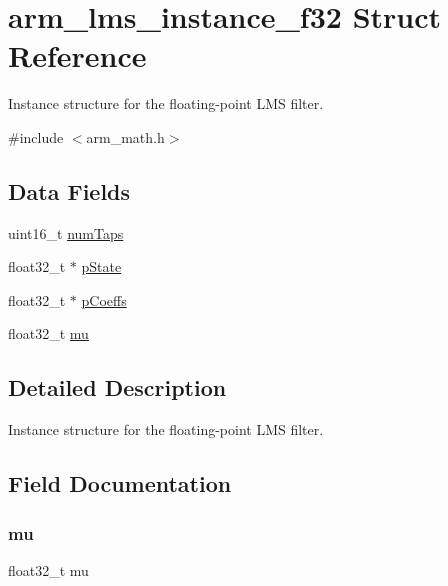 \hypertarget{structarm__lms__instance__f32}{}\section{arm\+\_\+lms\+\_\+instance\+\_\+f32 Struct Reference}
\label{structarm__lms__instance__f32}


Instance structure for the floating-\/point L\+MS filter.  




{\ttfamily \#include $<$arm\+\_\+math.\+h$>$}

\subsection*{Data Fields}
\begin{DoxyCompactItemize}
\item 
uint16\+\_\+t \mbox{\hyperlink{structarm__lms__instance__f32_a751941891e47f522a7f5375fe8990aac}{num\+Taps}}
\item 
float32\+\_\+t $\ast$ \mbox{\hyperlink{structarm__lms__instance__f32_a335c87e6fdc4b96601d95a5de8b9c463}{p\+State}}
\item 
float32\+\_\+t $\ast$ \mbox{\hyperlink{structarm__lms__instance__f32_aacbb8dd8eeba4b21fc2bb40076405ee3}{p\+Coeffs}}
\item 
float32\+\_\+t \mbox{\hyperlink{structarm__lms__instance__f32_a11402afa7c9b9dac4cb953fa386e74d2}{mu}}
\end{DoxyCompactItemize}


\subsection{Detailed Description}
Instance structure for the floating-\/point L\+MS filter. 

\subsection{Field Documentation}
\mbox{\label{structarm__lms__instance__f32_a11402afa7c9b9dac4cb953fa386e74d2}} 
\subsubsection{\texorpdfstring{mu}{mu}}
{\footnotesize\ttfamily float32\+\_\+t mu}

